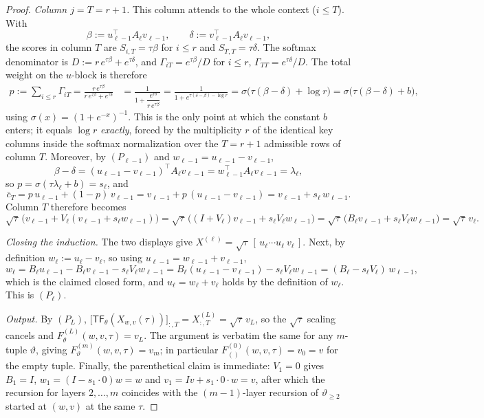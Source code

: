 \documentclass[11pt]{article}
\theoremstyle{definition}
\theoremstyle{remark}
\theoremstyle{plain}
\newcommand{\sig}{\sigma}
\newcommand{\TF}{\mathsf{TF}}
\begin{document}
\begin{proof}
\emph{Column $j=T=r+1$.}  This column attends to the whole context ($i\le T$).  With
\[
\beta:=u_{\ell-1}^\top A_\ell v_{\ell-1},
\qquad
\delta:=v_{\ell-1}^\top A_\ell v_{\ell-1},
\]
the scores in column $T$ are $S_{i,T}=\tau\beta$ for $i\le r$ and $S_{T,T}=\tau\delta$.
The softmax denominator is $D:=r\,e^{\tau\beta}+e^{\tau\delta}$, and
$\Gamma_{iT}=e^{\tau\beta}/D$ for $i\le r$, $\Gamma_{TT}=e^{\tau\delta}/D$.
The total weight on the $u$-block is therefore
\begin{align*}
p:=\sum_{i\le r}\Gamma_{iT}
=\frac{r\,e^{\tau\beta}}{r\,e^{\tau\beta}+e^{\tau\delta}}
&=\frac{1}{1+\dfrac{e^{\tau\delta}}{r\,e^{\tau\beta}}}
=\frac{1}{1+e^{\tau(\delta-\beta)-\log r}}
=\sig\big(\tau(\beta-\delta)+\log r\big)
=\sig\big(\tau(\beta-\delta)+b\big),
\end{align*}
using $\sig(x)=(1+e^{-x})^{-1}$.  This is the only point at which the constant $b$ enters;
it equals $\log r$ \emph{exactly}, forced by the multiplicity $r$ of the identical key
columns inside the softmax normalization over the $T=r+1$ admissible rows of column $T$.
Moreover, by $(P_{\ell-1})$ and $w_{\ell-1}=u_{\ell-1}-v_{\ell-1}$,
\[
\beta-\delta=(u_{\ell-1}-v_{\ell-1})^\top A_\ell v_{\ell-1}
=w_{\ell-1}^\top A_\ell v_{\ell-1}=\lambda_\ell,
\]
so $p=\sig(\tau\lambda_\ell+b)=s_\ell$, and
\[
\bar c_T=p\,u_{\ell-1}+(1-p)\,v_{\ell-1}
=v_{\ell-1}+p\,(u_{\ell-1}-v_{\ell-1})
=v_{\ell-1}+s_\ell\,w_{\ell-1}.
\]
Column $T$ therefore becomes
\[
\sqrt\tau\,\big(v_{\ell-1}+V_\ell(v_{\ell-1}+s_\ell w_{\ell-1})\big)
=\sqrt\tau\,\big((I+V_\ell)v_{\ell-1}+s_\ell V_\ell w_{\ell-1}\big)
=\sqrt\tau\,\big(B_\ell v_{\ell-1}+s_\ell V_\ell w_{\ell-1}\big)
=\sqrt\tau\,v_\ell .
\]

\emph{Closing the induction.}  The two displays give
$X^{(\ell)}=\sqrt\tau\,[\,u_\ell\cdots u_\ell\ v_\ell\,]$.  Next, by definition
$w_\ell:=u_\ell-v_\ell$, so using $u_{\ell-1}=w_{\ell-1}+v_{\ell-1}$,
\[
w_\ell
=B_\ell u_{\ell-1}-B_\ell v_{\ell-1}-s_\ell V_\ell w_{\ell-1}
=B_\ell(u_{\ell-1}-v_{\ell-1})-s_\ell V_\ell w_{\ell-1}
=(B_\ell-s_\ell V_\ell)\,w_{\ell-1},
\]
which is the claimed closed form, and $u_\ell=w_\ell+v_\ell$ holds by the definition of
$w_\ell$.  This is $(P_\ell)$.

\emph{Output.}  By $(P_L)$,
$\big[\TF_\theta(X_{w,v}(\tau))\big]_{:,T}=X^{(L)}_{:,T}=\sqrt\tau\,v_L$, so the
$\sqrt\tau$ scaling cancels and $F^{(L)}_\theta(w,v,\tau)=v_L$.  The argument is verbatim
the same for any $m$-tuple $\vartheta$, giving $F^{(m)}_\vartheta(w,v,\tau)=v_m$; in
particular $F^{(0)}_{()}(w,v,\tau)=v_0=v$ for the empty tuple.  Finally, the parenthetical
claim is immediate: $V_1=0$ gives $B_1=I$, $w_1=(I-s_1\cdot 0)w=w$ and
$v_1=Iv+s_1\cdot 0\cdot w=v$, after which the recursion for layers $2,\dots,m$ coincides
with the $(m-1)$-layer recursion of $\vartheta_{\ge2}$ started at $(w,v)$ at the same
$\tau$.
\end{proof}
\end{document}
